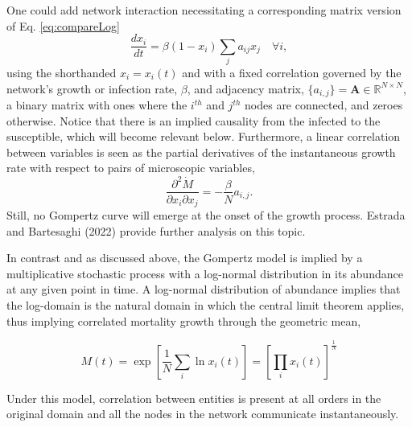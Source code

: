 \documentclass{article}
\begin{document}
One could add network interaction necessitating a corresponding matrix version of Eq. \ref{eq:compareLog}
\begin{equation}
\label{eq:networkSIR}
\frac{d x_i}{dt} = \beta (1-x_i)\sum_j{a_{ij}}x_j \quad \forall i,
\end{equation}
using the shorthanded $x_i=x_i(t)$ and with a fixed correlation governed by the network's growth or infection rate, $\beta$, and adjacency matrix, $\{a_{i,j}\}=\mathbf{A} \in \mathbb{R}^{N \times N}$, a binary matrix with ones where the $i^{th}$ and $j^{th}$ nodes are connected, and zeroes otherwise. Notice that there is an implied causality from the infected to the susceptible, which will become relevant below. Furthermore, a linear correlation between variables is seen as the partial derivatives of the instantaneous growth rate with respect to pairs of microscopic variables,
\begin{equation}
\frac{\partial^2 \dot{M}}{\partial x_i \partial x_j} = -\frac{\beta}{N} a_{i,j}.
\end{equation}
Still, no Gompertz curve will emerge at the onset of the growth process. Estrada and Bartesaghi (2022) \cite{estrada2022networked} provide further analysis on this topic.

In contrast and as discussed above, the Gompertz model is implied by a multiplicative stochastic process with a log-normal distribution in its abundance at any given point in time. A log-normal distribution of abundance implies that the log-domain is the natural domain in which the central limit theorem applies, thus implying correlated mortality growth through the geometric mean,

\begin{equation}
M(t) = \exp \left[\frac{1}{N}\sum_i \ln x_i(t)\right] = \left[\prod_i x_i (t)\right]^{\frac{1}{N}}
\end{equation} 

Under this model, correlation between entities is present at all orders in the original domain and all the nodes in the network communicate instantaneously.
\end{document}
